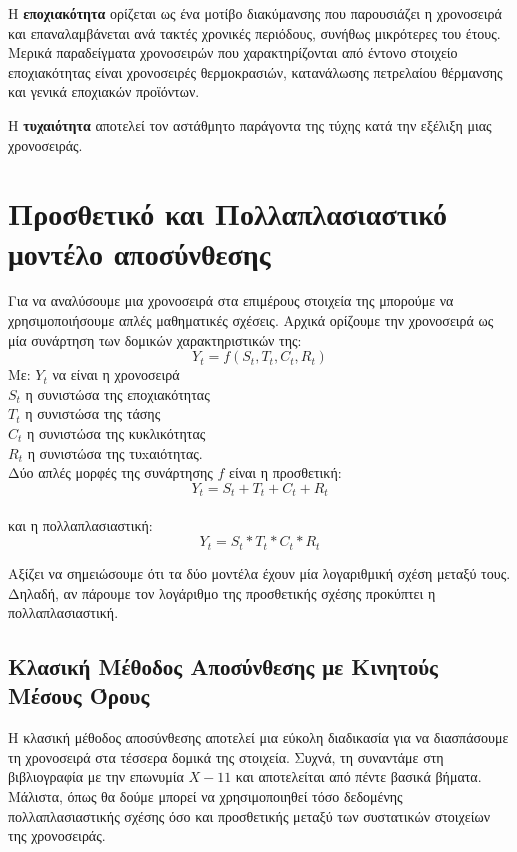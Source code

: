 Η \textbf{εποχιακότητα} ορίζεται ως ένα μοτίβο διακύμανσης που παρουσιάζει η χρονοσειρά και επαναλαμβάνεται ανά τακτές χρονικές περιόδους, συνήθως μικρότερες του έτους. Μερικά παραδείγματα χρονοσειρών που χαρακτηρίζονται από έντονο στοιχείο εποχιακότητας είναι χρονοσειρές θερμοκρασιών, κατανάλωσης πετρελαίου θέρμανσης και γενικά εποχιακών προϊόντων. 

Η \textbf{τυχαιότητα} αποτελεί τον αστάθμητο παράγοντα της τύχης κατά την εξέλιξη μιας χρονοσειράς.

\section{Προσθετικό και Πολλαπλασιαστικό μοντέλο αποσύνθεσης} 

Για να αναλύσουμε μια χρονοσειρά στα επιμέρους στοιχεία της μπορούμε να χρησιμοποιήσουμε απλές μαθηματικές σχέσεις. Αρχικά ορίζουμε την χρονοσειρά ως μία συνάρτηση των δομικών χαρακτηριστικών της:
\[ Y_t = f(S_t, T_t, C_t, R_t)\]
Με:
$Y_t$ να είναι η χρονοσειρά
\\
$S_t$ η συνιστώσα της εποχιακότητας
\\
$T_t$ η συνιστώσα της τάσης
\\
$C_t$ η συνιστώσα της κυκλικότητας
\\
$R_t$ η συνιστώσα της τυxαιότητας.
\\
Δύο απλές μορφές της συνάρτησης $f$ είναι η προσθετική: \\
\[ Y_t = S_t +  T_t +  C_t +  R_t \]
\\ και η πολλαπλασιαστική: \\
\[ Y_t = S_t *  T_t *  C_t *  R_t \]


Αξίζει να σημειώσουμε ότι τα δύο μοντέλα έχουν μία λογαριθμική σχέση μεταξύ τους. Δηλαδή, αν πάρουμε τον λογάριθμο της προσθετικής σχέσης προκύπτει η πολλαπλασιαστική.

\subsection{Κλασική Μέθοδος Αποσύνθεσης με Κινητούς Μέσους Όρους}
Η κλασική μέθοδος αποσύνθεσης αποτελεί μια εύκολη διαδικασία για να διασπάσουμε τη χρονοσειρά στα τέσσερα δομικά της στοιχεία. Συχνά, τη συναντάμε στη βιβλιογραφία με την επωνυμία $X-11$ και αποτελείται από πέντε βασικά βήματα. Μάλιστα, όπως θα δούμε μπορεί να χρησιμοποιηθεί τόσο δεδομένης πολλαπλασιαστικής σχέσης όσο και προσθετικής μεταξύ των συστατικών στοιχείων της χρονοσειράς.

